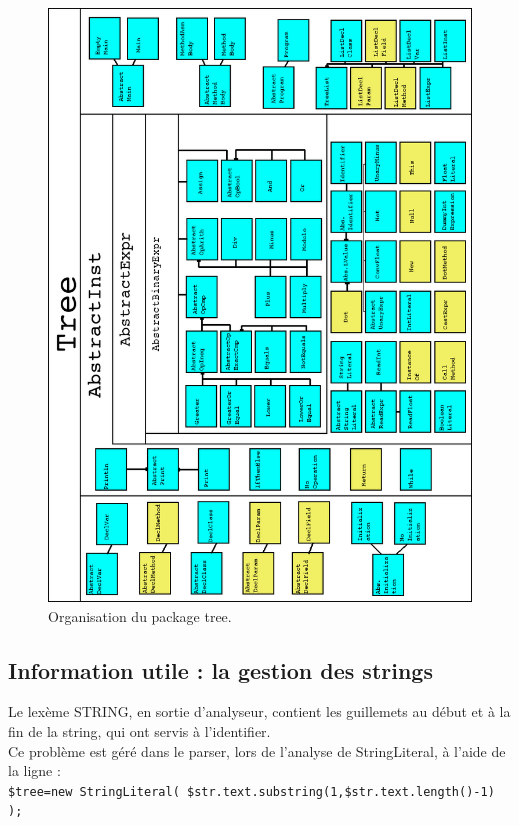 \documentclass[a4paper]{article}
\begin{document}
\begin{figure}
\centering
\includegraphics[width=1\textwidth]{SchemaTourne.png}
\caption{\label{fig:frog}Organisation du package tree.}
\end{figure}

\subsection{Information utile : la gestion des strings}
Le lexème STRING, en sortie d'analyseur, contient les guillemets au début et à la fin de la string, qui ont servis à l'identifier.\\
Ce problème est géré dans le parser, lors de l'analyse de StringLiteral, à l'aide de la ligne :\\
\texttt{\$tree=new StringLiteral( \$str.text.substring(1,\$str.text.length()-1) );}
\end{document}
